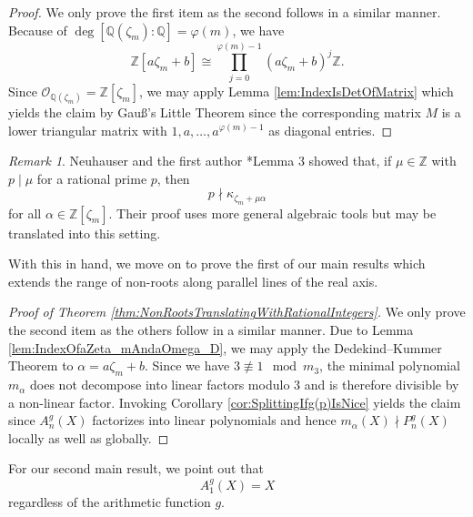 \documentclass[a4paper, 11pt, reqno]{amsart}
\theoremstyle{plain}
\theoremstyle{definition}
\theoremstyle{remark}
\newtheorem*{rmk}{Remark}
\numberwithin{equation}{section}
\newcommand{\Z}{\mathbb{Z}}
\newcommand{\Q}{\mathbb{Q}}
\begin{document}
\begin{proof}
    We only prove the first item as the second follows in a similar manner. Because of $\deg [\Q(\zeta_m) : \Q] = \varphi(m)$, we have
    \[\Z[a\zeta_m + b] \cong \prod_{j = 0}^{\varphi(m) - 1} (a\zeta_m + b)^j\Z.\]
    Since $\mathcal{O}_{\Q(\zeta_m)} = \Z[\zeta_m]$, we may apply Lemma \ref{lem:IndexIsDetOfMatrix} which yields the claim by Gau\ss's Little Theorem since the corresponding matrix $M$ is a lower triangular matrix with $1, a, \ldots, a^{\varphi(m) - 1}$ as diagonal entries.
\end{proof}

\begin{rmk}
    Neuhauser and the first author \cite{HeimNeu25}*{Lemma 3} showed that, if $\mu \in \Z$ with $p \mid \mu$ for a rational prime $p$, then
    \[p \nmid \kappa_{\zeta_m + \mu\alpha}\]
    for all $\alpha \in \Z[\zeta_m]$. Their proof uses more general algebraic tools but may be translated into this setting.
\end{rmk}

With this in hand, we move on to prove the first of our main results which extends the range of non-roots along parallel lines of the real axis.

\begin{proof}[Proof of Theorem \ref{thm:NonRootsTranslatingWithRationalIntegers}]
    We only prove the second item as the others follow in a similar manner. Due to Lemma \ref{lem:IndexOfaZeta_mAndaOmega_D}, we may apply the Dedekind--Kummer Theorem to $\alpha = a\zeta_m + b$. Since we have $3 \not \equiv 1 \mod m_3$, the minimal polynomial $m_\alpha$ does not decompose into linear factors modulo $3$ and is therefore divisible by a non-linear factor. Invoking Corollary \ref{cor:SplittingIfg(p)IsNice} yields the claim since $A_n^g(X)$ factorizes into linear polynomials and hence $m_\alpha(X) \nmid P_n^g(X)$ locally as well as globally.
\end{proof}

For our second main result, we point out that
\begin{equation}\label{eq:A_1^gA_2^g}
    A_1^g(X) = X
\end{equation}
regardless of the arithmetic function $g$.
\end{document}
